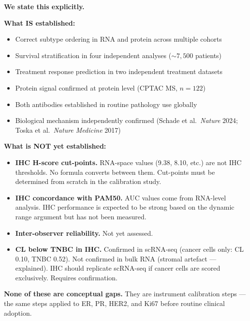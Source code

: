 \documentclass[11pt, a4paper]{article}
\begin{document}
\begin{mdframed}[backgroundcolor=honestybox,
                 linecolor=orange!60!black,
                 linewidth=1pt]
\textbf{We state this explicitly.}

\medskip
\textbf{What IS established:}
\begin{itemize}[noitemsep]
    \item Correct subtype ordering in RNA
    and protein across multiple cohorts
    \item Survival stratification in four
    independent analyses (${\sim}7{,}500$
    patients)
    \item Treatment response prediction in
    two independent treatment datasets
    \item Protein signal confirmed at
    protein level (CPTAC MS, $n=122$)
    \item Both antibodies established in
    routine pathology use globally
    \item Biological mechanism independently
    confirmed (Schade et al.\
    \textit{Nature} 2024; Toska et al.\
    \textit{Nature Medicine} 2017)
\end{itemize}

\medskip
\textbf{What is NOT yet established:}
\begin{itemize}[noitemsep]
    \item \textbf{IHC H-score cut-points.}
    RNA-space values (9.38, 8.10, etc.)
    are not IHC thresholds. No formula
    converts between them. Cut-points
    must be determined from scratch in
    the calibration study.
    \item \textbf{IHC concordance with
    PAM50.} AUC values come from RNA-level
    analysis. IHC performance is expected
    to be strong based on the dynamic
    range argument but has not been
    measured.
    \item \textbf{Inter-observer
    reliability.} Not yet assessed.
    \item \textbf{CL below TNBC in IHC.}
    Confirmed in scRNA-seq (cancer cells
    only: CL 0.10, TNBC 0.52). Not
    confirmed in bulk RNA (stromal artefact
    --- explained). IHC should replicate
    scRNA-seq if cancer cells are scored
    exclusively. Requires confirmation.
\end{itemize}

\medskip
\textbf{None of these are conceptual gaps.}
They are instrument calibration steps ---
the same steps applied to ER, PR, HER2,
and Ki67 before routine clinical adoption.
\end{mdframed}
\end{document}
